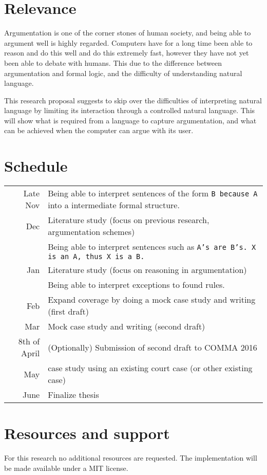 \documentclass[a4paper]{article}
\begin{document}


\section*{Relevance}
Argumentation is one of the corner stones of human society, and being able to argument well is highly regarded. Computers have for a long time been able to reason and do this well and do this extremely fast, however they have not yet been able to debate with humans. This due to the difference between argumentation and formal logic, and the difficulty of understanding natural language.

This research proposal suggests to skip over the difficulties of interpreting natural language by limiting its interaction through a controlled natural language. This will show what is required from a language to capture argumentation, and what can be achieved when the computer can argue with its user.

\section*{Schedule}
\begin{tabularx}{\linewidth}{r|X}
    Late Nov & Being able to interpret sentences of the form \texttt{B because A} into a intermediate formal structure.\\
    Dec & Literature study (focus on previous research, argumentation schemes)\\
        & Being able to interpret sentences such as \texttt{A's are B's. X is an A, thus X is a B.} \\
    Jan & Literature study (focus on reasoning in argumentation)\\
        & Being able to interpret exceptions to found rules.\\
    Feb & Expand coverage by doing a mock case study and writing (first draft)\\
    Mar & Mock case study and writing (second draft)\\
    8th of April & (Optionally) Submission of second draft to COMMA 2016\\
    May  & case study using an existing court case (or other existing case)\\
    June & Finalize thesis\\
\end{tabularx}

\section*{Resources and support}
For this research no additional resources are requested. The implementation will be made available under a MIT license.

{}

\end{document}
